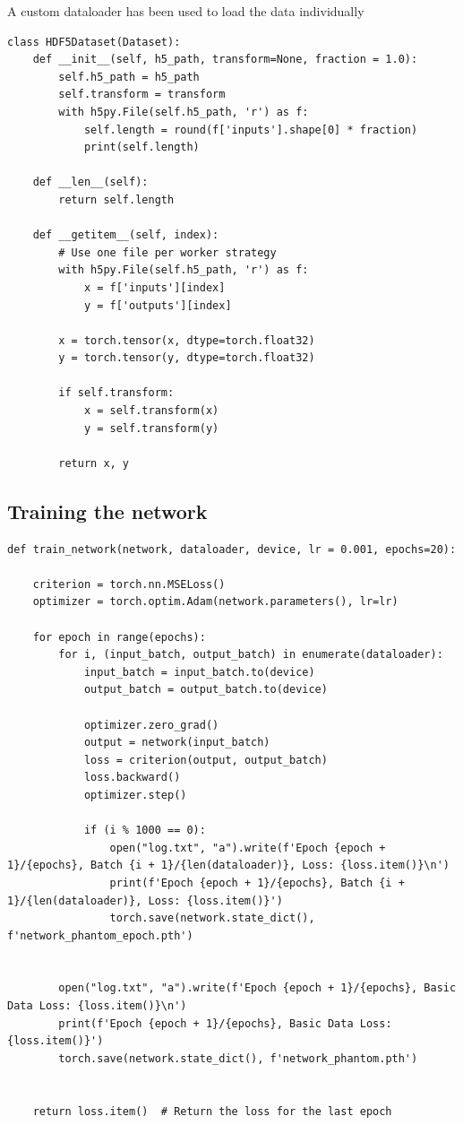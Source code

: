 A custom dataloader has been used to load the data individually

\begin{verbatim}
class HDF5Dataset(Dataset):
    def __init__(self, h5_path, transform=None, fraction = 1.0):
        self.h5_path = h5_path
        self.transform = transform
        with h5py.File(self.h5_path, 'r') as f:
            self.length = round(f['inputs'].shape[0] * fraction)
            print(self.length)

    def __len__(self):
        return self.length

    def __getitem__(self, index):
        # Use one file per worker strategy
        with h5py.File(self.h5_path, 'r') as f:
            x = f['inputs'][index]
            y = f['outputs'][index]

        x = torch.tensor(x, dtype=torch.float32)
        y = torch.tensor(y, dtype=torch.float32)

        if self.transform:
            x = self.transform(x)
            y = self.transform(y)

        return x, y
\end{verbatim}

\subsection{Training the network}

\begin{verbatim}
def train_network(network, dataloader, device, lr = 0.001, epochs=20):

    criterion = torch.nn.MSELoss()
    optimizer = torch.optim.Adam(network.parameters(), lr=lr)

    for epoch in range(epochs):
        for i, (input_batch, output_batch) in enumerate(dataloader):
            input_batch = input_batch.to(device)
            output_batch = output_batch.to(device)

            optimizer.zero_grad()
            output = network(input_batch)
            loss = criterion(output, output_batch)
            loss.backward()
            optimizer.step()

            if (i % 1000 == 0):
                open("log.txt", "a").write(f'Epoch {epoch + 1}/{epochs}, Batch {i + 1}/{len(dataloader)}, Loss: {loss.item()}\n')
                print(f'Epoch {epoch + 1}/{epochs}, Batch {i + 1}/{len(dataloader)}, Loss: {loss.item()}')
                torch.save(network.state_dict(), f'network_phantom_epoch.pth')


        open("log.txt", "a").write(f'Epoch {epoch + 1}/{epochs}, Basic Data Loss: {loss.item()}\n')
        print(f'Epoch {epoch + 1}/{epochs}, Basic Data Loss: {loss.item()}')
        torch.save(network.state_dict(), f'network_phantom.pth')


    return loss.item()  # Return the loss for the last epoch
\end{verbatim}